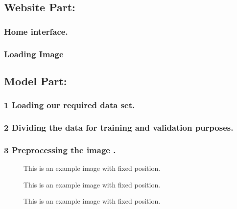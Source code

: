 \documentclass[12pt,a4paper]{article}
\begin{document}
\subsection*{Website Part:}
\subsubsection*{Home interface.}
\subsubsection*{Loading Image}

\subsection*{Model Part:}


\subsubsection*{1 Loading our required data set.}
\subsubsection*{2 Dividing the data for training and validation purposes. }
\subsubsection*{3 Preprocessing the image .}


\begin{figure}[H] %
    \centering
    \caption{This is an example image with fixed position.}
\end{figure}

\begin{figure}[H] %
    \centering
    \caption{This is an example image with fixed position.}
\end{figure}

\begin{figure}[H] %
    \centering
    \caption{This is an example image with fixed position.}
\end{figure}
\end{document}
